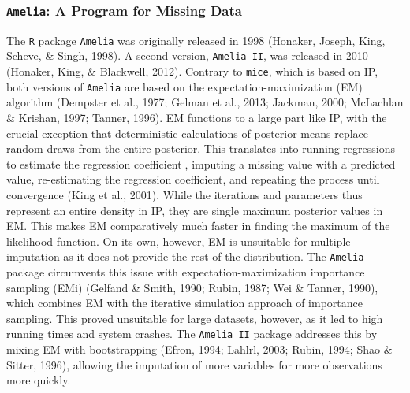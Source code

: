 \documentclass[12pt,econ]{sources/authesis}
\begin{document}
\hypertarget{ordmiss-theory-multimpute-amelia}{%
\subsubsection{\texorpdfstring{\texttt{Amelia}: A Program for Missing Data}{Amelia: A Program for Missing Data}}\label{ordmiss-theory-multimpute-amelia}}

The \texttt{R} package \texttt{Amelia} was originally released in 1998 (Honaker, Joseph, King, Scheve, \& Singh, 1998). A second version, \texttt{Amelia\ II}, was released in 2010 (Honaker, King, \& Blackwell, 2012). Contrary to \texttt{mice}, which is based on IP, both versions of \texttt{Amelia} are based on the expectation-maximization (EM) algorithm (Dempster et al., 1977; Gelman et al., 2013; Jackman, 2000; McLachlan \& Krishan, 1997; Tanner, 1996). EM functions to a large part like IP, with the crucial exception that deterministic calculations of posterior means replace random draws from the entire posterior. This translates into running regressions to estimate the regression coefficient􏰒, imputing a missing value with a predicted value, re-estimating the regression coefficient, and repeating the process until convergence (King et al., 2001). While the iterations and parameters thus represent an entire density in IP, they are single maximum posterior values in EM. This makes EM comparatively much faster in finding the maximum of the likelihood function. On its own, however, EM is unsuitable for multiple imputation as it does not provide the rest of the distribution. The \texttt{Amelia} package circumvents this issue with expectation-maximization importance sampling (EMi) (Gelfand \& Smith, 1990; Rubin, 1987; Wei \& Tanner, 1990), which combines EM with the iterative simulation approach of importance sampling. This proved unsuitable for large datasets, however, as it led to high running times and system crashes. The \texttt{Amelia\ II} package addresses this by mixing EM with bootstrapping (Efron, 1994; Lahlrl, 2003; Rubin, 1994; Shao \& Sitter, 1996), allowing the imputation of more variables for more observations more quickly.
\end{document}

